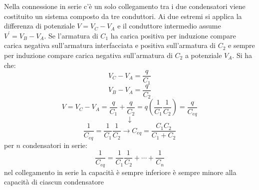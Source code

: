 \documentclass[a4paper,12pt, oneside]{book}
\begin{document}
\begin{itemize}
\begin{center}
\end{center}
Nella connessione in serie c'è un solo collegamento tra i due condensatori  viene costituito un sistema composto da tre conduttori. Ai due estremi si applica la differenza di potenziale $V=V_C-V_A$ e il conduttore intermedio assume $V^{'}=V_B-V_A$. Se l'armatura di $C_1$ ha carica positiva per induzione compare carica negativa sull'armatura interfacciata e positiva sull'armatura di $C_2$ e sempre per induzione compare carica negativa sull'armatura di $C_2$ a potenziale $V_A$. Si ha che:
$$V_C-V_A=\frac{q}{C_1}$$
$$V_B-V_A=\frac{q}{C_2}$$
$$V=V_C-V_A=\frac{q}{C_1}+\frac{q}{C_2}=q\left(\frac{1}{C_1}\frac{1}{C_2}\right)=\frac{q}{C_{eq}}$$
$$\downarrow$$
$$\frac{1}{C_{eq}}=\frac{1}{C_1}\frac{1}{C_2}\longrightarrow C_{eq}=\frac{C_1C_2}{C_1+C_2}$$
per $n$ condensatori in serie:
$$\frac{1}{C_{eq}}=\frac{1}{C_1}\frac{1}{C_2}+\cdots+\frac{1}{C_n}$$
nel collegamento in serie la capacità è sempre inferiore è sempre minore alla capacità di ciascun condensatore
\end{itemize}
\end{document}
